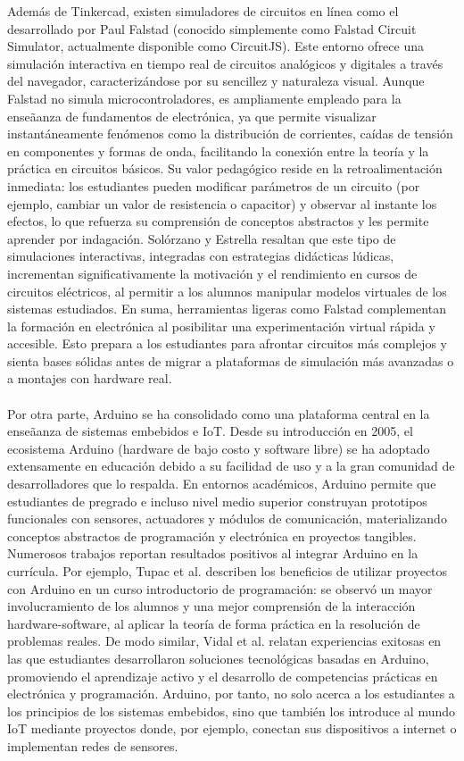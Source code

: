 \documentclass{article}
\begin{document}
Adem\'as de Tinkercad, existen simuladores de circuitos en l\'inea como el desarrollado por Paul Falstad (conocido simplemente como Falstad Circuit Simulator, actualmente disponible como CircuitJS). Este entorno ofrece una simulación interactiva en tiempo real de circuitos analógicos y digitales a través del navegador, caracteriz\'andose por su sencillez y naturaleza visual. Aunque Falstad no simula microcontroladores, es ampliamente empleado para la ense\~aanza de fundamentos de electrónica, ya que permite visualizar instant\'aneamente fenómenos como la distribución de corrientes, ca\'idas de tensión en componentes y formas de onda, facilitando la conexión entre la teor\'ia y la pr\'actica en circuitos b\'asicos. Su valor pedagógico reside en la retroalimentación inmediata: los estudiantes pueden modificar par\'ametros de un circuito (por ejemplo, cambiar un valor de resistencia o capacitor) y observar al instante los efectos, lo que refuerza su comprensión de conceptos abstractos y les permite aprender por indagación. Solórzano y Estrella \cite{Solorzano2024} resaltan que este tipo de simulaciones interactivas, integradas con estrategias did\'acticas lúdicas, incrementan significativamente la motivación y el rendimiento en cursos de circuitos eléctricos, al permitir a los alumnos manipular modelos virtuales de los sistemas estudiados. En suma, herramientas ligeras como Falstad complementan la formación en electrónica al posibilitar una experimentación virtual r\'apida y accesible. Esto prepara a los estudiantes para afrontar circuitos m\'as complejos y sienta bases sólidas antes de migrar a plataformas de simulación m\'as avanzadas o a montajes con hardware real.
\\\\
Por otra parte, Arduino se ha consolidado como una plataforma central en la ense\~aanza de sistemas embebidos e IoT. Desde su introducción en 2005, el ecosistema Arduino (hardware de bajo costo y software libre) se ha adoptado extensamente en educación debido a su facilidad de uso y a la gran comunidad de desarrolladores que lo respalda. En entornos académicos, Arduino permite que estudiantes de pregrado e incluso nivel medio superior construyan prototipos funcionales con sensores, actuadores y módulos de comunicación, materializando conceptos abstractos de programación y electrónica en proyectos tangibles\cite{Vidal2019}. Numerosos trabajos reportan resultados positivos al integrar Arduino en la curr\'icula. Por ejemplo, Tupac et al. \cite{Tupac2021} describen los beneficios de utilizar proyectos con Arduino en un curso introductorio de programación: se observó un mayor involucramiento de los alumnos y una mejor comprensión de la interacción hardware-software, al aplicar la teor\'ia de forma pr\'actica en la resolución de problemas reales. De modo similar, Vidal et al. \cite{Vidal2019} relatan experiencias exitosas en las que estudiantes desarrollaron soluciones tecnológicas basadas en Arduino, promoviendo el aprendizaje activo y el desarrollo de competencias pr\'acticas en electrónica y programación. Arduino, por tanto, no solo acerca a los estudiantes a los principios de los sistemas embebidos, sino que también los introduce al mundo IoT mediante proyectos donde, por ejemplo, conectan sus dispositivos a internet o implementan redes de sensores.
\end{document}
